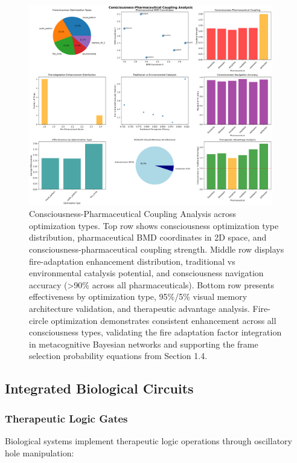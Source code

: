 \documentclass[12pt,a4paper]{article}
\begin{document}
\begin{figure}[htbp]
    \centering
    \includegraphics[width=0.95\textwidth]{images/consciousness_pharmaceutical_coupling_20251004_100821.png}
    \caption{Consciousness-Pharmaceutical Coupling Analysis across optimization types. Top row shows consciousness optimization type distribution, pharmaceutical BMD coordinates in 2D space, and consciousness-pharmaceutical coupling strength. Middle row displays fire-adaptation enhancement distribution, traditional vs environmental catalysis potential, and consciousness navigation accuracy (>90\% across all pharmaceuticals). Bottom row presents effectiveness by optimization type, 95\%/5\% visual memory architecture validation, and therapeutic advantage analysis. Fire-circle optimization demonstrates consistent enhancement across all consciousness types, validating the fire adaptation factor integration in metacognitive Bayesian networks and supporting the frame selection probability equations from Section 1.4.}
    \label{fig:consciousness_coupling}
    \end{figure}

\subsection{Integrated Biological Circuits}

\subsubsection{Therapeutic Logic Gates}

Biological systems implement therapeutic logic operations through oscillatory hole manipulation:
\end{document}
